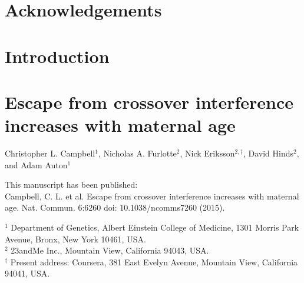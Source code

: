 \documentclass[11pt,twoside,openright,letterpaper]{memoir}
\begin{document}
\chapter{Acknowledgements}


\tableofcontents
\listoffigures
\listoftables

\mainmatter

\chapter{Introduction}


\chapter{Escape from crossover interference increases with maternal age}


\noindent Christopher L. Campbell$^1$, Nicholas A. Furlotte$^2$, Nick Eriksson$^{2,\dagger}$, David Hinds$^2$, and Adam Auton$^1$

\vspace{0.5cm}
\noindent This manuscript has been published: \\
Campbell, C. L. et al. Escape from crossover interference increases with maternal age. Nat. Commun. 6:6260 doi: 10.1038/ncomms7260 (2015).

\vspace{0.5cm}
\noindent $^1$ Department of Genetics, Albert Einstein College of Medicine, 1301 Morris Park Avenue, Bronx, New York 10461, USA. \\
\noindent $^2$ 23andMe Inc., Mountain View, California 94043, USA. \\
\noindent $^\dagger$ Present address: Coursera, 381 East Evelyn Avenue, Mountain View, California 94041, USA. \\
\end{document}
